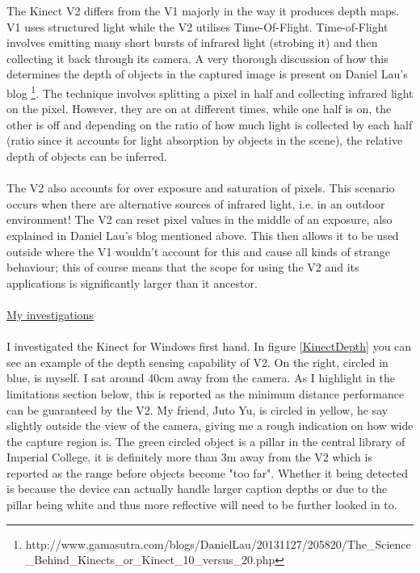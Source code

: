 \documentclass[11pt]{article}
\begin{document}
The Kinect V2 differs from the V1 majorly in the way it produces depth maps.
V1 uses structured light while the V2 utilises Time-Of-Flight. Time-of-Flight
involves emitting many short bursts of infrared light (strobing it) and then
collecting it back through its camera. A very thorough discussion of how this
determines the depth of objects in the captured image is present on Daniel
Lau's blog \footnote{http://www.gamasutra.com/blogs/DanielLau/20131127/205820/The\_Science\_Behind\_Kinects\_or\_Kinect\_10\_versus\_20.php}.
The technique involves splitting a pixel in half and collecting infrared light
on the pixel. However, they are on at different times, while one half is on, 
the other is off and depending on the ratio of how much light is collected 
by each half (ratio since it accounts for light absorption by objects in the scene),
the relative depth of objects can be inferred. 
\\ \\
The V2 also accounts for over exposure and saturation of pixels. This scenario
occurs when there are alternative sources of infrared light, i.e. in an outdoor
environment! The V2 can reset pixel values in the middle of an exposure, also
explained in Daniel Lau's blog mentioned above. This then
allows it to be used outside where the V1 wouldn't account for this and cause
all kinds of strange behaviour; this of course means that the scope for using
the V2 and its applications is significantly larger than it ancestor.
\\ \\
\underline{My investigations} \\ \\
I investigated the Kinect for Windows first hand. In figure \ref{KinectDepth} 
you can see an example of the depth sensing capability of V2. On the right,
circled in blue, is myself. I sat around 40cm away from the camera. As I highlight 
in the limitations section below, this is reported as the minimum distance 
performance can be guaranteed by the V2. My friend, Juto Yu, is circled in 
yellow, he say slightly outside the view of the camera, giving me a rough 
indication on how wide the capture region is. The green circled object is a 
pillar in the central library of Imperial College, it is definitely more than 
3m away from the V2 which is reported as the range before objects become 
"too far". Whether it being detected is because the device can actually 
handle larger caption depths or due to the pillar being white and thus 
more reflective will need to be further looked in to.
\end{document}
